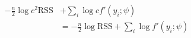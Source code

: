 \documentclass[10pt]{article}
\begin{document}
\begin{align*}\begin{split}
-\frac{n}{2}\log{c^2\textrm{RSS}} &+ \sum_i\log{c f'\left(y_i;\psi\right)} \\
&= -\frac{n}{2}\log{\textrm{RSS}} + \sum_i\log{ f'\left(y_i;\psi\right)} \\
\end{split}\end{align*}
\end{document}
